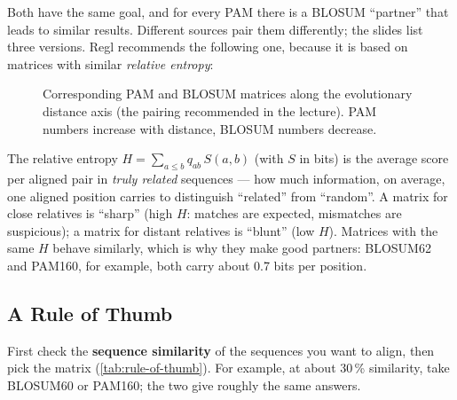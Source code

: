 \documentclass[11pt, oneside]{book}
\let\originalsubsection\subsection
\renewcommand{\subsection}{\Needspace{6\baselineskip}\originalsubsection}
\begin{document}
Both have the same goal, and for every PAM there is a BLOSUM ``partner'' that
leads to similar results. Different sources pair them differently; the
slides list three versions. Regl recommends the following one, because it is
based on matrices with similar \emph{relative entropy}:

\begin{figure}[htbp]
\centering
{}
\caption{Corresponding PAM and BLOSUM matrices along the evolutionary
distance axis (the pairing recommended in the lecture). PAM numbers increase
with distance, BLOSUM numbers decrease.}
\label{fig:pam-blosum-axis}
\end{figure}

\begin{notebox}[title={Background: what ``relative entropy'' measures}]
The relative entropy $H = \sum_{a \le b} q_{ab}\, S(a,b)$ (with $S$ in bits) is
the average score per aligned pair in \emph{truly related} sequences --- how
much information, on average, one aligned position carries to distinguish
``related'' from ``random''. A matrix for close relatives is ``sharp'' (high
$H$: matches are expected, mismatches are suspicious); a matrix for distant
relatives is ``blunt'' (low $H$). Matrices with the same $H$ behave similarly,
which is why they make good partners: BLOSUM62 and PAM160, for example, both
carry about 0.7 bits per position.
\end{notebox}

\subsection{A Rule of Thumb}

First check the \textbf{sequence similarity} of the sequences you want to
align, then pick the matrix (\cref{tab:rule-of-thumb}). For example, at about
30\,\% similarity, take BLOSUM60 or PAM160; the two give roughly the same
answers.
\end{document}
